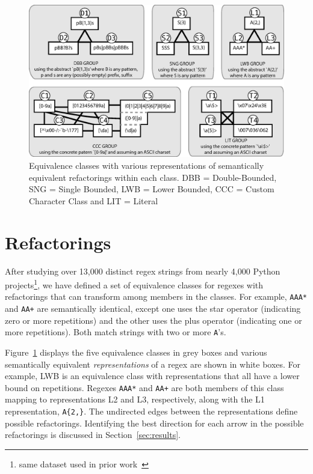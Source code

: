 



\begin{figure}[tb]
\centering
\includegraphics[width=\textwidth]{illustrations/refactoringTree.eps}
\vspace{-12pt}
\caption{Equivalence classes with various representations of semantically equivalent refactorings within each class. DBB = Double-Bounded, SNG = Single Bounded, LWB = Lower Bounded, CCC = Custom Character Class and LIT = Literal}
\vspace{-6pt}
\label{fig:refactoringTree}
\end{figure}





\section{Refactorings}
\label{sec:refactoring}
After studying over 13,000 distinct regex strings from nearly 4,000 Python projects\footnote{same dataset used in prior work~\cite{chapman2016}}, we have defined a set of equivalence classes for regexes with refactorings that can transform among members in the classes.
For example,  \verb!AAA*! and \verb!AA+! are semantically identical, except one uses the star operator (indicating zero or more repetitions) and the other uses the plus operator (indicating one or more repetitions).
Both match strings with two or more \verb!A!'s.

Figure~\ref{fig:refactoringTree} displays the five equivalence classes in grey boxes and various semantically equivalent \emph{representations} of a regex are shown in white boxes. For example, LWB is an equivalence class with representations that all have a lower bound on repetitions. Regexes \verb!AAA*! and \verb!AA+!  are both members of this class mapping to representations L2 and L3, respectively, along with the L1 representation, \verb!A{2,}!.
The undirected edges between the representations define possible refactorings.
Identifying the best direction for each arrow in the possible refactorings is discussed in Section~\ref{sec:results}.

